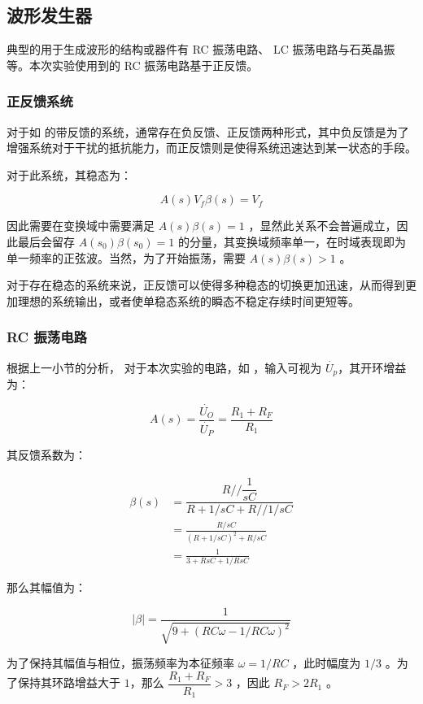 \documentclass[lang=cn,11pt,a4paper,cite=authoryear]{elegantpaper}
\begin{document}
\subsection{波形发生器}

典型的用于生成波形的结构或器件有 RC 振荡电路、 LC 振荡电路与石英晶振等。本次实验使用到的 RC 振荡电路基于正反馈。

\subsubsection{正反馈系统}

对于如  的带反馈的系统，通常存在负反馈、正反馈两种形式，其中负反馈是为了增强系统对于干扰的抵抗能力，而正反馈则是使得系统迅速达到某一状态的手段。

对于此系统，其稳态为：

\[A(s) V_f \beta(s) = V_f\]

因此需要在变换域中需要满足 \(A(s) \beta(s) = 1\) ，显然此关系不会普遍成立，因此最后会留存 \(A(s_0) \beta(s_0) = 1\)  的分量，其变换域频率单一，在时域表现即为单一频率的正弦波。当然，为了开始振荡，需要 \(A(s) \beta(s) > 1\) 。

对于存在稳态的系统来说，正反馈可以使得多种稳态的切换更加迅速，从而得到更加理想的系统输出，或者使单稳态系统的瞬态不稳定存续时间更短等。


\subsubsection{RC 振荡电路}

根据上一小节的分析， 对于本次实验的电路，如  ，输入可视为 \(\dot{U_p}\)，其开环增益为：

\[A(s) = \dfrac{\dot{U_O}}{\dot{U_P}} = \dfrac{R_1 + R_F}{R_1}\]

其反馈系数为： 

\[\begin{aligned}
    \beta(s) &= \dfrac{R // \dfrac{1}{sC}}{R + {1}/{sC} + R // {1}/{sC}} \\ 
    &= \frac{R / sC}{(R + 1 / sC)^2 + R / sC} \\ 
    &= \frac{1}{3 + RsC + 1 / RsC}
\end{aligned} \]

那么其幅值为：

\[|\beta| = \frac{1}{\sqrt{9 + (RC\omega - 1/RC\omega)^2}}\]

为了保持其幅值与相位，振荡频率为本征频率 \(\omega = 1 / RC\) ，此时幅度为 \(1 / 3\) 。为了保持其环路增益大于 \(1\)，那么 \(\dfrac{R_1 + R_F}{R_1} > 3\) ，因此 \(R_F > 2 R_1\) 。
\end{document}

